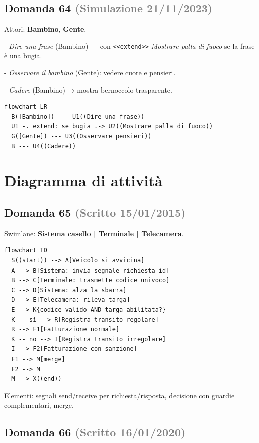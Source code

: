 \documentclass[a4paper,11pt]{article}
\begin{document}
\subsection*{Domanda 64 \hfill {\small \textcolor{gray}{(Simulazione 21/11/2023)}}}
Attori: \textbf{Bambino}, \textbf{Gente}.

- \textit{Dire una frase} (Bambino) — con \texttt{\textless{}\textless{}extend\textgreater{}\textgreater{}} \textit{Mostrare palla di fuoco} se la frase è una bugia.

- \textit{Osservare il bambino} (Gente): vedere cuore e pensieri.

- \textit{Cadere} (Bambino) → mostra bernoccolo trasparente.

\begin{verbatim}
flowchart LR
  B([Bambino]) --- U1((Dire una frase))
  U1 -. extend: se bugia .-> U2((Mostrare palla di fuoco))
  G([Gente]) --- U3((Osservare pensieri))
  B --- U4((Cadere))
\end{verbatim}




\section{Diagramma di attività}

\subsection*{Domanda 65 \hfill {\small \textcolor{gray}{(Scritto 15/01/2015)}}}
Swimlane: \textbf{Sistema casello | Terminale | Telecamera}.

\begin{verbatim}
flowchart TD
  S((start)) --> A[Veicolo si avvicina]
  A --> B[Sistema: invia segnale richiesta id]
  B --> C[Terminale: trasmette codice univoco]
  C --> D[Sistema: alza la sbarra]
  D --> E[Telecamera: rileva targa]
  E --> K{codice valido AND targa abilitata?}
  K -- sì --> R[Registra transito regolare]
  R --> F1[Fatturazione normale]
  K -- no --> I[Registra transito irregolare]
  I --> F2[Fatturazione con sanzione]
  F1 --> M[merge]
  F2 --> M
  M --> X((end))
\end{verbatim}
Elementi: segnali send/receive per richiesta/risposta, decisione con guardie complementari, merge.



\subsection*{Domanda 66 \hfill {\small \textcolor{gray}{(Scritto 16/01/2020)}}}
\end{document}
